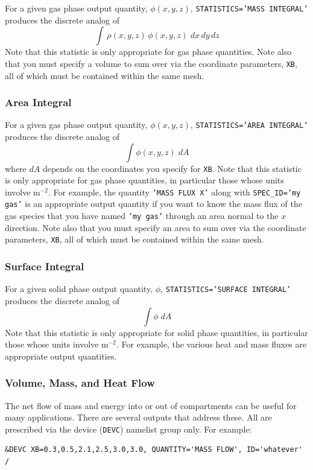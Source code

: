 \documentclass[11pt]{book}
\newcommand{\ct}{\tt\small}
\newcommand{\be}{\begin{equation}}
\newcommand{\ee}{\end{equation}}
\begin{document}
For a given gas phase output quantity, $\phi(x,y,z)$, {\ct STATISTICS='MASS INTEGRAL'} produces the discrete analog of
\be \int \, \rho(x,y,z) \, \phi(x,y,z) \; dx \, dy \, dz \ee
Note that this statistic is only appropriate for gas phase quantities. Note also that you must specify a volume to sum over via the
coordinate parameters, {\ct XB}, all of which must be contained within the same mesh.

\subsubsection{Area Integral}

For a given gas phase output quantity, $\phi(x,y,z)$, {\ct STATISTICS='AREA INTEGRAL'} produces the discrete analog of
\be \int \phi(x,y,z) \; dA \ee
where $dA$ depends on the coordinates you specify for {\ct XB}.
Note that this statistic is only appropriate for gas phase quantities, in particular those whose units involve m$^{-2}$. For example,
the quantity {\ct 'MASS FLUX X'} along with {\ct SPEC\_ID='my gas'} is an appropriate output quantity if you want to know the mass flux of the gas species that
you have named {\ct 'my gas'} through an
area normal to the $x$ direction. Note also that you must specify an area to sum over via the
coordinate parameters, {\ct XB}, all of which must be contained within the same mesh.

\subsubsection{Surface Integral}

For a given solid phase output quantity, $\phi$, {\ct STATISTICS='SURFACE INTEGRAL'} produces the discrete analog of
\be \int \phi \; dA \ee
Note that this statistic is only appropriate for solid phase quantities, in particular those whose units involve m$^{-2}$. For example, the various heat and mass
fluxes are appropriate output quantities.


\subsubsection{Volume, Mass, and Heat Flow}
\label{info:flows}

The net flow of mass and energy into or out of compartments can be useful for many applications. There are several outputs that address these. All are prescribed via
the device ({\ct DEVC}) namelist group only. For example:

\footnotesize
\begin{verbatim}
&DEVC XB=0.3,0.5,2.1,2.5,3.0,3.0, QUANTITY='MASS FLOW', ID='whatever' /
\end{verbatim}
\normalsize
\end{document}
